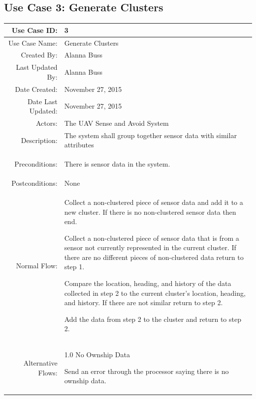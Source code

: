 \documentclass[12pt,oneside,letterpaper]{article}
\newenvironment{packed_enumerate}{ %
\vspace{-7mm}
\begin{enumerate}
  \setlength{\itemsep}{0pt}
  \setlength{\parskip}{0pt}
  \setlength{\parsep}{0pt}
}{\end{enumerate}
\vspace{-8mm}}
\begin{document}
\subsection{\label{GenerateCluster}Use Case 3: Generate Clusters}
\begin{longtable}{|r|p{3.8in}|}
\hline
Use Case ID:&3\\
\hline
Use Case Name:& Generate Clusters\\
\hline
Created By: & Alanna Buss\\
\hline
Last Updated By: & Alanna Buss\\
\hline
Date Created: & November 27, 2015\\
\hline
Date Last Updated: & November 27, 2015\\
\hline
Actors: & The UAV Sense and Avoid System\\
\hline
Description: & The system shall group together sensor data with similar attributes\\
\hline
Preconditions: & 
\begin{packed_enumerate}
\item There is sensor data in the system.
\end{packed_enumerate}\\
\hline
Postconditions: & None\\
\hline
Normal Flow: & 
\begin{packed_enumerate}
\item Collect a non-clustered piece of sensor data and add it to a new cluster. If there is no non-clustered sensor data then end.
\item Collect a non-clustered piece of sensor data that is from a sensor not currently represented in the current cluster. If there are no different pieces of non-clustered data return to step 1.
\item Compare the location, heading, and history of the data collected in step 2 to the current cluster's location, heading, and history. If there are not similar return to step 2.
\item Add the data from step 2 to the cluster and return to step 2.
\end{packed_enumerate}\\
\hline
Alternative Flows: & 1.0 No Ownship Data
\newline
\begin{packed_enumerate}
\item Send an error through the processor saying there is no ownship data.
\end{packed_enumerate}\\

\end{longtable}
\end{document}
